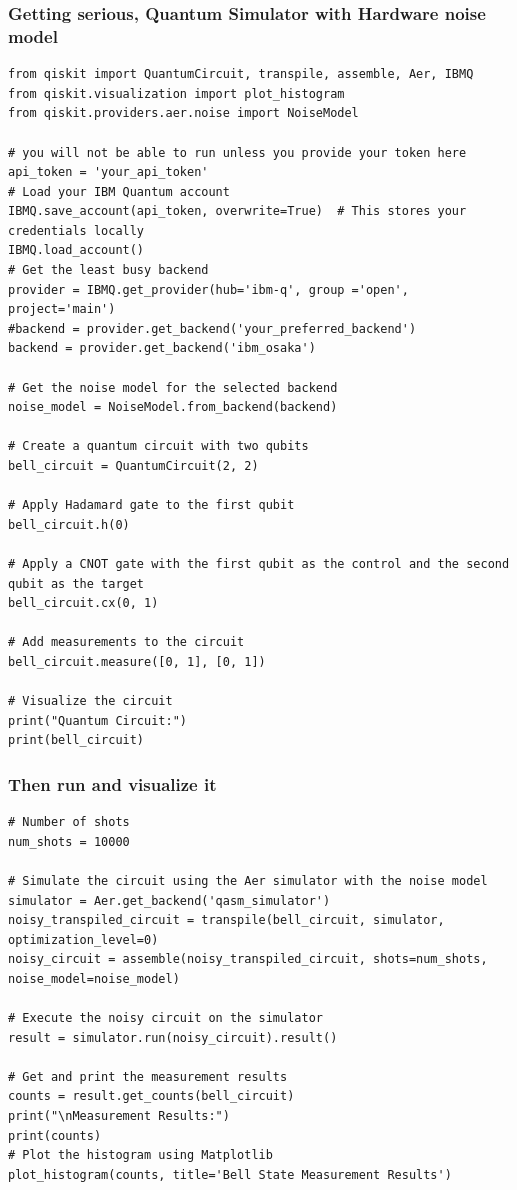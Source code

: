 \documentclass{beamer}
\begin{document}
\begin{frame}
\frametitle{Getting serious, Quantum Simulator with Hardware noise model}

\begin{verbatim}
from qiskit import QuantumCircuit, transpile, assemble, Aer, IBMQ
from qiskit.visualization import plot_histogram
from qiskit.providers.aer.noise import NoiseModel

# you will not be able to run unless you provide your token here
api_token = 'your_api_token'
# Load your IBM Quantum account
IBMQ.save_account(api_token, overwrite=True)  # This stores your credentials locally
IBMQ.load_account()
# Get the least busy backend
provider = IBMQ.get_provider(hub='ibm-q', group ='open', project='main')
#backend = provider.get_backend('your_preferred_backend')
backend = provider.get_backend('ibm_osaka')

# Get the noise model for the selected backend
noise_model = NoiseModel.from_backend(backend)

# Create a quantum circuit with two qubits
bell_circuit = QuantumCircuit(2, 2)

# Apply Hadamard gate to the first qubit
bell_circuit.h(0)

# Apply a CNOT gate with the first qubit as the control and the second qubit as the target
bell_circuit.cx(0, 1)

# Add measurements to the circuit
bell_circuit.measure([0, 1], [0, 1])

# Visualize the circuit
print("Quantum Circuit:")
print(bell_circuit)

\end{verbatim}
\end{frame}

\begin{frame}
\frametitle{Then run and visualize it}

\begin{verbatim}
# Number of shots
num_shots = 10000

# Simulate the circuit using the Aer simulator with the noise model
simulator = Aer.get_backend('qasm_simulator')
noisy_transpiled_circuit = transpile(bell_circuit, simulator, optimization_level=0)
noisy_circuit = assemble(noisy_transpiled_circuit, shots=num_shots, noise_model=noise_model)

# Execute the noisy circuit on the simulator
result = simulator.run(noisy_circuit).result()

# Get and print the measurement results
counts = result.get_counts(bell_circuit)
print("\nMeasurement Results:")
print(counts)
# Plot the histogram using Matplotlib
plot_histogram(counts, title='Bell State Measurement Results')

\end{verbatim}
\end{frame}
\end{document}
